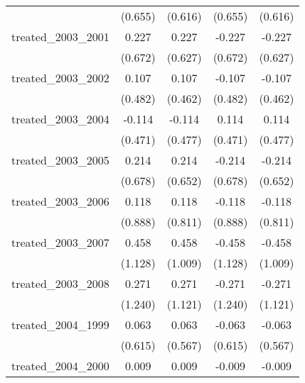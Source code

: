 {\begin{tabular}{l*{4}{c}}
            &     (0.655)         &     (0.616)         &     (0.655)         &     (0.616)         \\
[1em]
treated\_2003\_2001&       0.227         &       0.227         &      -0.227         &      -0.227         \\
            &     (0.672)         &     (0.627)         &     (0.672)         &     (0.627)         \\
[1em]
treated\_2003\_2002&       0.107         &       0.107         &      -0.107         &      -0.107         \\
            &     (0.482)         &     (0.462)         &     (0.482)         &     (0.462)         \\
[1em]
treated\_2003\_2004&      -0.114         &      -0.114         &       0.114         &       0.114         \\
            &     (0.471)         &     (0.477)         &     (0.471)         &     (0.477)         \\
[1em]
treated\_2003\_2005&       0.214         &       0.214         &      -0.214         &      -0.214         \\
            &     (0.678)         &     (0.652)         &     (0.678)         &     (0.652)         \\
[1em]
treated\_2003\_2006&       0.118         &       0.118         &      -0.118         &      -0.118         \\
            &     (0.888)         &     (0.811)         &     (0.888)         &     (0.811)         \\
[1em]
treated\_2003\_2007&       0.458         &       0.458         &      -0.458         &      -0.458         \\
            &     (1.128)         &     (1.009)         &     (1.128)         &     (1.009)         \\
[1em]
treated\_2003\_2008&       0.271         &       0.271         &      -0.271         &      -0.271         \\
            &     (1.240)         &     (1.121)         &     (1.240)         &     (1.121)         \\
[1em]
treated\_2004\_1999&       0.063         &       0.063         &      -0.063         &      -0.063         \\
            &     (0.615)         &     (0.567)         &     (0.615)         &     (0.567)         \\
[1em]
treated\_2004\_2000&       0.009         &       0.009         &      -0.009         &      -0.009         \\

\end{tabular}}
